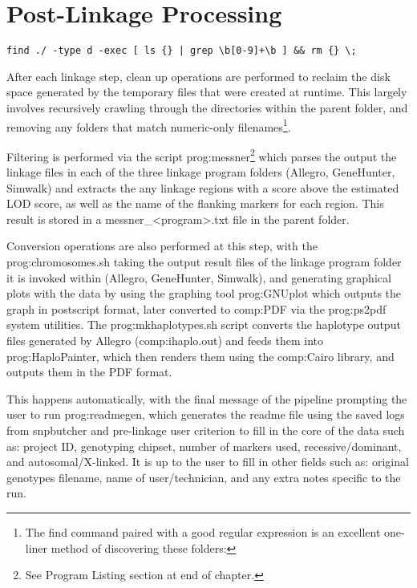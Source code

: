 \section{Post-Linkage Processing}

\begin{lrbox}\myVerb\scriptsize
    \verb!find ./ -type d -exec [ ls {} | grep \b[0-9]+\b ] && rm {} \;!
\end{lrbox}%

After each linkage step, clean up operations are performed to reclaim the disk space generated by the temporary files that were created at runtime. This largely involves recursively crawling through the directories within the parent folder, and removing any folders that match numeric-only filenames\footnote{The find command paired with a good regular expression is an excellent one-liner method of discovering these folders: \usebox\myVerb}.

Filtering is performed via the script \gls{prog:messner}\footnote{See Program Listing section at end of chapter.} which parses the output the linkage files in each of the three linkage program folders (Allegro, GeneHunter, Simwalk) and extracts the any linkage regions with a score above the estimated LOD score, as well as the name of the flanking markers for each region. This result is stored in a messner\_<program>.txt file in the parent folder.

Conversion operations are also performed at this step, with the \gls{prog:chromosomes.sh} taking the output result files of the linkage program folder it is invoked within (Allegro, GeneHunter, Simwalk), and generating graphical plots with the data by using the graphing tool \gls{prog:GNUplot} which outputs the graph in postscript format, later converted to \gls{comp:PDF} via the \gls{prog:ps2pdf} system utilities. The \gls{prog:mkhaplotypes.sh} script converts the haplotype output files generated by Allegro (\gls{comp:ihaplo.out}) and feeds them into \gls{prog:HaploPainter}, which then renders them using the \gls{comp:Cairo} library, and outputs them in the PDF format.

This happens automatically, with the final message of the pipeline prompting the user to run \gls{prog:readmegen}, which generates the readme file using the saved logs from snpbutcher and pre-linkage user criterion to fill in the core of the data such as: project ID, genotyping chipset, number of markers used, recessive/dominant, and autosomal/X-linked. It is up to the user to fill in other fields such as: original genotypes filename, name of user/technician, and any extra notes specific to the run.

